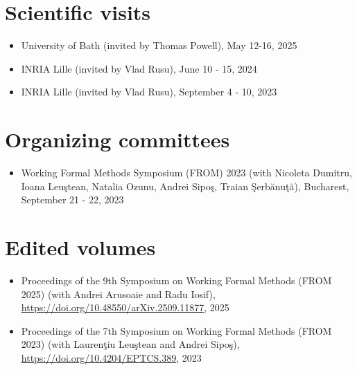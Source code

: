 \documentclass[letterpaper,11pt,oneside]{article}
\begin{document}
\noindent
\section{Scientific visits}
\normalsize 
\begin{itemize}
    \item University of Bath (invited by Thomas Powell), May 12-16, 2025
    \item INRIA Lille (invited by Vlad Rusu), June 10 - 15, 2024
    \item INRIA Lille (invited by Vlad Rusu), September 4 - 10, 2023
\end{itemize}
\mbox{}


\noindent
\section{Organizing committees}
\normalsize 
\begin{itemize}
    \item Working Formal Methods Symposium (FROM) 2023
    (with Nicoleta Dumitru, Ioana Leu\c{s}tean, Natalia Ozunu, Andrei Sipo\c{s}, Traian \c{S}erb\u{a}nu\c{t}\u{a}), Bucharest, September 21 - 22, 2023
\end{itemize}
\mbox{}

\noindent 
\section{Edited volumes}
\normalsize 
\begin{itemize}
    \item Proceedings of the 9th Symposium on Working Formal Methods (FROM 2025) 
    (with Andrei Arusoaie and Radu Iosif),
    \url{https://doi.org/10.48550/arXiv.2509.11877}, 2025
    \item Proceedings of the 7th Symposium on Working Formal Methods (FROM 2023) 
    (with Lauren\c{t}iu Leu\c{s}tean and Andrei Sipo\c{s}), 
    \url{https://doi.org/10.4204/EPTCS.389}, 2023
\end{itemize}
\end{document}
